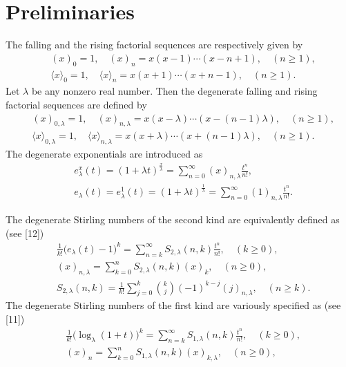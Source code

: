\documentclass[a4paper,11pt]{amsart}
\begin{document}
\section{Preliminaries} 
The falling and the rising factorial sequences are respectively given by
\begin{align*}
&(x)_{0}=1,\quad (x)_{n}=x(x-1)\cdots(x-n+1),\quad(n \ge 1), \\
&\langle x \rangle_{0}=1,\quad \langle x \rangle_{n}=x(x+1)\cdots(x+n-1),\quad(n \ge 1).
\end{align*}
Let $\lambda$ be any nonzero real number. Then
the degenerate falling and rising factorial sequences are defined by
\begin{align*}
&(x)_{0,\lambda}=1,\quad (x)_{n,\lambda}=x(x-\lambda)\cdots(x-(n-1)\lambda),\quad(n \ge 1), \\
&\langle x \rangle_{0,\lambda}=1,\quad \langle x \rangle_{n,\lambda}=x(x+\lambda)\cdots(x+(n-1)\lambda),\quad(n \ge 1).
\end{align*}
The degenerate exponentials are introduced as
\begin{align*}
&e_{\lambda}^{x}(t)=(1+\lambda t)^{\frac{x}{\lambda}}=\sum_{n=0}^{\infty}(x)_{n,\lambda}\frac{t^{n}}{n!}, \\
&e_{\lambda}(t)=e_{\lambda}^{1}(t)=(1+\lambda t)^{\frac{1}{\lambda}}=\sum_{n=0}^{\infty}(1)_{n,\lambda}\frac{t^{n}}{n!}.
\end{align*} \par
The degenerate Stirling numbers of the second kind are equivalently defined as (see [12])
\begin{equation} \label{1}
\begin{aligned}
&\frac{1}{k!}\big(e_{\lambda}(t)-1 \big)^{k}=\sum_{n=k}^{\infty}S_{2,\lambda}(n,k)\frac{t^{n}}{n!},\quad (k \ge 0), \\
&(x)_{n,\lambda}=\sum_{k=0}^{n}S_{2,\lambda}(n,k)(x)_{k},\quad(n \ge 0), \\
&S_{2,\lambda}(n,k)=\frac{1}{k!}\sum_{j=0}^{k}\binom{k}{j}(-1)^{k-j}(j)_{n,\lambda},\quad(n \ge k).
\end{aligned}
\end{equation}
The degenerate Stirling numbers of the first kind are variously specified as (see [11])
\begin{equation} \label{2}
\begin{aligned}
&\frac{1}{k!}\big(\log_{\lambda}(1+t)\big)^{k}=\sum_{n=k}^{\infty}S_{1,\lambda}(n,k)\frac{t^{n}}{n!}, \quad (k \ge 0),\\
&(x)_{n}=\sum_{k=0}^{n}S_{1,\lambda}(n,k)(x)_{k,\lambda},\quad (n \ge 0), 
\end{aligned}
\end{equation}
\end{document}
